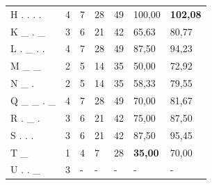 \begin{table}[!htb]
\begin{tabular}{@{}lllllll@{}}
H . . . .                                                    & 4                          & 7                            & 28                         & 49                           & 100,00                     & \textbf{102,08                      } \\
K \_ . \_                                                    & 3                          & 6                            & 21                         & 42                           & 65,63                      & 80,77                        \\
L . \_ . .                                                   & 4                          & 7                            & 28                         & 49                           & 87,50                      & 94,23                        \\
M \_ \_                                                      & 2                          & 5                            & 14                         & 35                           & 50,00                      & 72,92                        \\
N \_ .                                                       & 2                          & 5                            & 14                         & 35                           & 58,33                      & 79,55                        \\
Q \_ \_ . \_                                                 & 4                          & 7                            & 28                         & 49                           & 70,00                      & 81,67                        \\
R . \_ .                                                     & 3                          & 6                            & 21                         & 42                           & 75,00                      & 87,50                        \\
S . . .                                                      & 3                          & 6                            & 21                         & 42                           & 87,50                      & 95,45                        \\
T \_                                                         & 1                          & 4                            & 7                          & 28                           & \textbf{35,00}                      & 70,00                        \\
U . . \_                                                     & 3                          & -                              & -                          & -                            & -                      & -                              \\ \bottomrule
\end{tabular}
\end{table}

